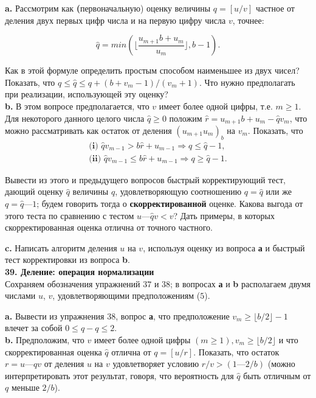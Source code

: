 \documentclass{mai_book}
\begin{document}
\textbf{a.} Рассмотрим как \textbf(первоначальную) оценку величины $q = [u/v]$ частное от деления двух первых цифр числа и на первую цифру числа $v$, точнее:

\[
\widehat{q} = min (\lfloor \frac{u_{m+1}b+u_{m}}{u_{m}} \rfloor , b - 1).
\]

\noindent Как в этой формуле определить простым способом наименьшее из двух чисел? Показать, что $q \leqslant \widehat{q} \leqslant q + (b + v_{m} - 1)/(v_{m} + 1)$. Что нужно предполагать при реализации, использующей эту оценку?\\

\textbf{b.} В этом вопросе предполагается, что $v$ имеет более одной цифры, т.е. $m \geqslant 1$. Для некоторого данного целого числа $\widehat{q} \geqslant 0$ положим $\widehat{r} = u_{m+1}b + u_{m} - \widehat{q}v_{m}$, что можно рассматривать как остаток от деления $(u_{m+1}u_{m})_{b}$ на $v_{m}$. Показать, что
\begin{eqnarray*}
\textbf{(i) } \hat{q}v_{m-1} > b\hat{r} + u_{m-1} \Longrightarrow q \le \hat{q}-1,\\
\textbf{(ii) } \hat{q}v_{m-1} \le b\hat{r} + u_{m-1} \Longrightarrow q \ge \hat{q}-1.
\end{eqnarray*}

Вывести из этого и предыдущего вопросов быстрый корректирующий тест, дающий оценку $\widehat{q}$ величины $q$, удовлетворяющую соотношению $q = \widehat{q}$ или же $q = \widehat{q} — 1$; будем говорить тогда о \textbf{скорректированной} оценке. Какова выгода от этого теста по сравнению с тестом $u — \widehat{q}v < v$? Дать примеры, в которых скорректированная оценка отлична от точного частного.

\textbf{c.} Написать алгоритм деления $u$ на $v$, используя оценку из вопроса \textbf{а} и быстрый тест корректировки из вопроса \textbf{b}.
\\

\textbf{39. Деление: операция нормализации}\\

Сохраняем обозначения упражнений $37$ и $38$; в вопросах \textbf{а} и \textbf{b} располагаем двумя числами $u$, $v$, удовлетворяющими предположениям ($5$).

\textbf{a.} Вывести из упражнения $38$, вопрос \textbf{а}, что предположение $v_{m} \geqslant \lfloor b/2 \rfloor -1$ влечет за собой $0\leqslant \widehat{q} - q \leqslant 2$.\\

\textbf{b.} Предположим, что $v$ имеет более одной цифры $(m \geqslant 1), v_{m} \geqslant \lfloor b/2 \rfloor$ и что скорректированная оценка $\widehat{q}$ отлична от $q = [u/r]$. Показать, что остаток $r = u — qv$ от деления $u$ на $v$ удовлетворяет условию $r/v > (1 — 2/b)$ (можно интерпретировать этот результат, говоря, что вероятность для $\widehat{q}$ быть отличным от $q$ меньше $2/b$).\\
\end{document}
